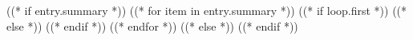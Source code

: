 ((* if entry.summary *))
    ((* for item in entry.summary *))
        ((* if loop.first *))
        ((* else *))
        ((* endif *))
    ((* endfor *))
((* else *))
((* endif *))